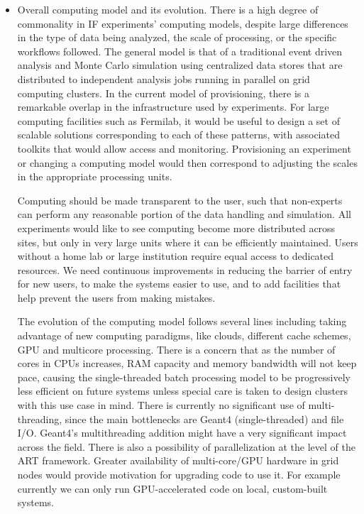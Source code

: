 \begin{itemize}
\item Overall computing model and its evolution.  There is a high degree of
commonality in IF experiments' computing models, despite large differences in
the type of data being analyzed, the scale of processing, or the specific
workflows followed.   The general model is that of a traditional event driven
analysis and Monte Carlo simulation using centralized data stores that are
distributed to independent analysis jobs running in parallel on grid computing
clusters.  In the current model of provisioning, there is a remarkable overlap
in the infrastructure used by experiments. For large computing facilities such
as Fermilab, it would be useful to design a set of scalable solutions
corresponding to each of these patterns, with associated toolkits that would
allow access and monitoring. Provisioning an experiment or changing a
computing model would then correspond to adjusting the scales in the
appropriate processing units.

Computing should be made transparent to the user, such that non-experts can
perform any reasonable portion of the data handling and simulation. All
experiments would like to see computing become more distributed across sites,
but only in very large units where it can be efficiently maintained.  Users
without a home lab or large institution require equal access to dedicated
resources. We need  continuous improvements in reducing the barrier of entry
for new users, to make the systems easier to use, and to add facilities that
help prevent the users from making mistakes.

The evolution of the computing model follows several lines including taking
advantage of new computing paradigms, like clouds, different cache schemes,
GPU and multicore processing. There is a concern that as the number of cores
in CPUs increases, RAM capacity and memory bandwidth will not keep pace,
causing the single-threaded batch processing model to be progressively less
efficient on future systems unless special care is taken to design clusters
with this use case in mind. There is currently no significant use of multi-
threading, since the main bottlenecks are Geant4 (single-threaded) and file
I/O. Geant4's multithreading addition might have a very significant impact
across the field. There is also a possibility of parallelization at the level
of the ART framework. Greater availability of multi-core/GPU hardware in grid
nodes would provide motivation for upgrading code to use it. For example
currently we can only run GPU-accelerated code on local, custom-built systems.

\end{itemize}

